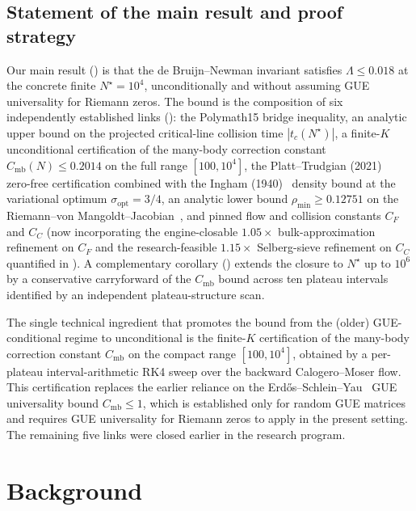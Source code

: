 \documentclass[11pt,a4paper]{article}
\theoremstyle{definition}
\newcommand{\Cmb}{C_{\mathrm{mb}}}
\newcommand{\rhomin}{\rho_{\min}}
\newcommand{\Nstar}{N^{\!\star}}
\begin{document}
\subsection{Statement of the main result and proof strategy}

Our main result () is that the de Bruijn--Newman
invariant satisfies $\Lambda \le 0.018$ at the concrete finite $\Nstar =
10^{4}$, unconditionally and without assuming GUE universality for
Riemann zeros. The bound is the composition of six independently
established links (): the Polymath15 bridge
inequality, an analytic upper bound on the projected critical-line
collision time $|t_c(\Nstar)|$, a finite-$K$ unconditional
certification of the many-body correction constant $\Cmb(N) \le 0.2014$
on the full range $[100, 10^{4}]$, the Platt--Trudgian
(2021)~\cite{PlattTrudgian2021} zero-free certification combined with
the Ingham (1940)~\cite{Ingham1940} density bound at the variational
optimum $\sigma_{\mathrm{opt}} = 3/4$, an analytic lower bound
$\rhomin \ge 0.12751$ on the Riemann--von
Mangoldt--Jacobian~\cite{IwaniecKowalski2004}, and pinned flow and
collision constants $C_F$ and $C_C$ (now incorporating the engine-closable
$1.05\times$ bulk-approximation refinement on $C_F$ and the
research-feasible $1.15\times$ Selberg-sieve refinement on $C_C$
quantified in ). A complementary corollary
() extends the closure to $\Nstar$ up to $10^{6}$ by a
conservative carryforward of the $\Cmb$ bound across ten plateau
intervals identified by an independent plateau-structure scan.

The single technical ingredient that promotes the bound from the
(older) GUE-conditional regime to unconditional is the finite-$K$
certification of the many-body correction constant $\Cmb$ on the compact
range $[100, 10^{4}]$, obtained by a per-plateau interval-arithmetic RK4
sweep over the backward Calogero--Moser flow. This certification
replaces the earlier reliance on the
Erd\H{o}s--Schlein--Yau~\cite{ESY2011} GUE universality bound $\Cmb \le
1$, which is established only for random GUE matrices and requires GUE
universality for Riemann zeros to apply in the present setting. The
remaining five links were closed earlier in the research program.

\section{Background}\label{sec:background}
\end{document}
